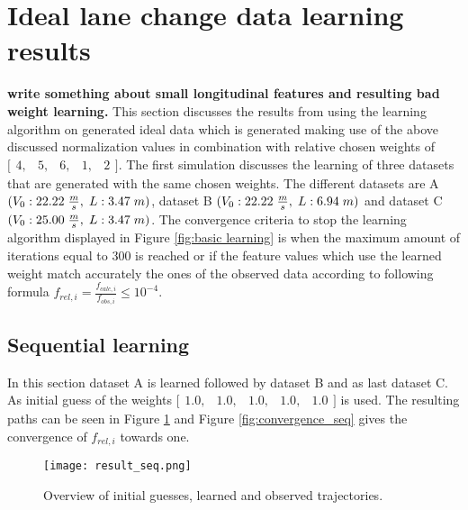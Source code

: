 \section{Ideal lane change data learning results} \label{s:ID_results}
\textbf{write something about small longitudinal features and resulting bad weight learning.}
This section discusses the results from using the learning algorithm on generated ideal data which is generated making use of the above discussed normalization values in combination with relative chosen weights of $ \bigl[ \begin{smallmatrix} 4,&5,&6,&1,&2\end{smallmatrix}\bigr]$. The first simulation discusses the learning of three datasets that are generated with the same chosen weights. The different datasets are A $(V_0:22.22\hspace{1mm}\frac{m}{s},\hspace{1mm} L:3.47\hspace{1mm}m)$, dataset B $(V_0:22.22\hspace{1mm}\frac{m}{s},\hspace{1mm} L:6.94\hspace{1mm}m)$ and dataset C $(V_0:25.00\hspace{1mm}\frac{m}{s},\hspace{1mm} L:3.47\hspace{1mm}m)$. The convergence criteria to stop the learning algorithm displayed in Figure \ref{fig:basic learning} is when the maximum amount of iterations equal to $300$ is reached or if the feature values which use the learned weight match accurately the ones of the observed data according to following formula $f_{rel,i} = \frac{f_{calc,i}}{f_{obs,i}} \leq 10^{-4}$.

\subsection{Sequential learning}
In this section dataset A is learned followed by dataset B and as last dataset C.
As initial guess of the weights $\bigl[ \begin{smallmatrix} 1.0,&1.0,&1.0,&1.0,&1.0\end{smallmatrix}\bigr]$ is used.  The resulting paths can be seen in Figure \ref{fig:result_seq} and Figure \ref{fig:convergence_seq} gives the convergence of $f_{rel,i}$ towards one.\\

\begin{figure}[h!]
	\centering
	\texttt{[image: result\_seq.png]}
	\caption{Overview of initial guesses, learned and observed trajectories.} 
	\label{fig:result_seq}
\end{figure}

